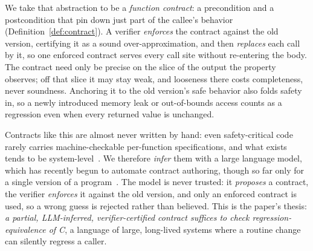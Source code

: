 \documentclass[conference]{IEEEtran}
\theoremstyle{definition}
\theoremstyle{remark}
\begin{document}
We take that abstraction to be a \emph{function contract}: a precondition
and a postcondition that pin down just part of the callee's behavior
(Definition~\ref{def:contract}). A verifier \emph{enforces} the contract against
the old version, certifying it as a sound over-approximation, and then
\emph{replaces} each call by it, so one enforced contract serves every
call site without re-entering the body. The contract need only be precise
on the slice of the output the property observes; off that slice it may
stay weak, and looseness there costs completeness, never soundness.
Anchoring it to the old version's safe behavior also folds safety in, so a
newly introduced memory leak or out-of-bounds access counts as a
regression even when every returned value is unchanged.

Contracts like this are almost never written by hand: even
safety-critical code rarely carries machine-checkable per-function
specifications, and what exists tends to be
system-level~\cite{wen2024autospec,granberry2024specifywhat,wang2025preguss}.
We therefore \emph{infer} them with a large language model, which has
recently begun to automate contract authoring, though so far only for a
single version of a
program~\cite{wen2024autospec,granberry2024specifywhat,wang2025preguss}.
The model is never trusted: it \emph{proposes} a contract, the verifier
\emph{enforces} it against the old version, and only an enforced
contract is used, so a wrong guess is rejected rather than believed.
This is the paper's thesis: \textit{a partial, LLM-inferred,
  verifier-certified contract suffices to check regression-equivalence of
C}, a language of large, long-lived systems where a
routine change can silently regress a caller.
\end{document}
